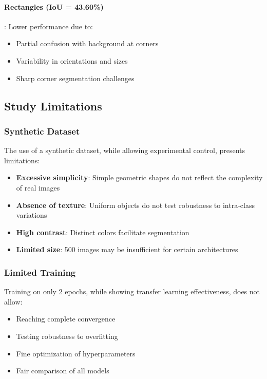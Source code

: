 \documentclass[12pt,a4paper]{article}
\begin{document}
\paragraph{Rectangles (IoU = 43.60\%)}: Lower performance due to:
\begin{itemize}
    \item Partial confusion with background at corners
    \item Variability in orientations and sizes
    \item Sharp corner segmentation challenges
\end{itemize}

\subsection{Study Limitations}

\subsubsection{Synthetic Dataset}

The use of a synthetic dataset, while allowing experimental control, presents limitations:
\begin{itemize}
    \item \textbf{Excessive simplicity}: Simple geometric shapes do not reflect the complexity of real images
    \item \textbf{Absence of texture}: Uniform objects do not test robustness to intra-class variations
    \item \textbf{High contrast}: Distinct colors facilitate segmentation
    \item \textbf{Limited size}: 500 images may be insufficient for certain architectures
\end{itemize}

\subsubsection{Limited Training}

Training on only 2 epochs, while showing transfer learning effectiveness, does not allow:
\begin{itemize}
    \item Reaching complete convergence
    \item Testing robustness to overfitting
    \item Fine optimization of hyperparameters
    \item Fair comparison of all models
\end{itemize}
\end{document}
